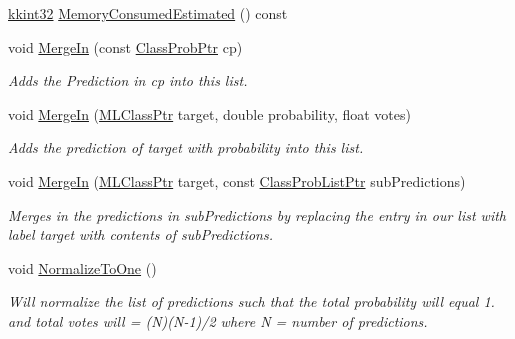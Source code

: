 \begin{DoxyCompactItemize}
\hyperlink{namespace_k_k_b_a8fa4952cc84fda1de4bec1fbdd8d5b1b}{kkint32} \hyperlink{class_k_k_m_l_l_1_1_class_prob_list_a624b9d228d1c1581026591e4d64a1d2a}{Memory\+Consumed\+Estimated} () const 
\item 
void \hyperlink{class_k_k_m_l_l_1_1_class_prob_list_aa9425fbae8decf7e56fc5f4a4cde8955}{Merge\+In} (const \hyperlink{namespace_k_k_m_l_l_aac4f1402b049fe046f3fa6c789a0c5d0}{Class\+Prob\+Ptr} cp)
\begin{DoxyCompactList}\small\item\em Adds the Prediction in \textquotesingle{}cp\textquotesingle{} into this list. \end{DoxyCompactList}\item 
void \hyperlink{class_k_k_m_l_l_1_1_class_prob_list_aeb4e819739dc92526d6bdedfb422fd98}{Merge\+In} (\hyperlink{namespace_k_k_m_l_l_ac272393853d59e72e8456f14cd6d8c23}{M\+L\+Class\+Ptr} target, double probability, float votes)
\begin{DoxyCompactList}\small\item\em Adds the prediction of \textquotesingle{}target\textquotesingle{} with \textquotesingle{}probability\textquotesingle{} into this list. \end{DoxyCompactList}\item 
void \hyperlink{class_k_k_m_l_l_1_1_class_prob_list_a49c9844c45b3c366306557654e155a78}{Merge\+In} (\hyperlink{namespace_k_k_m_l_l_ac272393853d59e72e8456f14cd6d8c23}{M\+L\+Class\+Ptr} target, const \hyperlink{class_k_k_m_l_l_1_1_class_prob_list_ae410f9bc9ad2f68c9587ec2ceedb82bd}{Class\+Prob\+List\+Ptr} sub\+Predictions)
\begin{DoxyCompactList}\small\item\em Merges in the predictions in \textquotesingle{}sub\+Predictions\textquotesingle{} by replacing the entry in our list with label \textquotesingle{}target\textquotesingle{} with contents of \textquotesingle{}sub\+Predictions\textquotesingle{}. \end{DoxyCompactList}\item 
void \hyperlink{class_k_k_m_l_l_1_1_class_prob_list_a998993b0a25ba7fd35cfa540277d0638}{Normalize\+To\+One} ()
\begin{DoxyCompactList}\small\item\em Will normalize the list of predictions such that the total probability will equal 1. and total votes will = (N)(N-\/1)/2 where N = number of predictions. \end{DoxyCompactList}\item 

\end{DoxyCompactItemize}

